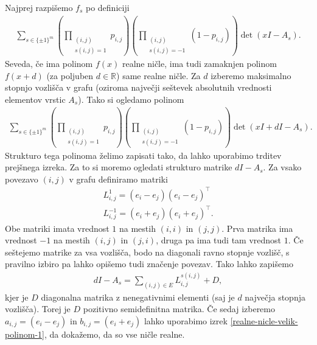 \begin{dokaz}
    Najprej razpišemo \(f_s\) po definiciji
    \begin{align*}
        \sum_{s\in \{\pm 1\}^m} \left(\prod_{\substack{(i,j) \\s(i,j)=1}} p_{i,j}\right) \left(\prod_{\substack{(i,j)\\s(i,j)=-1}} (1- p_{i,j})\right) \det(xI - A_s).
    \end{align*}
    Seveda, če ima polinom \(f(x)\) realne ničle, ima tudi zamaknjen polinom \(f(x+d)\) (za poljuben \(d\in \mathbb R\)) same realne ničle. Za \(d\) izberemo maksimalno stopnjo vozlišča v grafu (oziroma največji seštevek absolutnih vrednosti elementov vrstic \(A_s\)). Tako si ogledamo polinom
    \begin{align*}
        \sum_{s\in \{\pm 1\}^m} \left(\prod_{\substack{(i,j) \\s(i,j)=1}} p_{i,j}\right) \left(\prod_{\substack{(i,j)\\s(i,j)=-1}} (1- p_{i,j})\right) \det(xI + dI - A_s).
    \end{align*}
    Strukturo tega polinoma želimo zapisati tako, da lahko uporabimo trditev prejšnega izreka. Za to si moremo ogledati strukturo matrike \(dI - A_s\). Za vsako povezavo \((i,j)\) v grafu definiramo matriki
    \begin{align*}
        L_{i,j}^1 = (e_i-e_j)(e_i-e_j)^\top \\
        L_{i,j}^{-1} = (e_i+e_j)(e_i+e_j)^\top.
    \end{align*}
    Obe matriki imata vrednost \(1\) na mestih \((i,i)\) in \((j,j)\). Prva matrika ima vrednost \(-1\) na mestih \((i,j)\) in \((j,i)\), druga pa ima tudi tam vrednost \(1\). Če seštejemo matrike za vsa vozlišča, bodo na diagonali ravno stopnje vozlišč, s pravilno izbiro pa lahko opišemo tudi značenje povezav. Tako lahko zapišemo
    \begin{align*}
        dI - A_s = \sum_{(i,j)\in E} L_{i,j}^{s(i,j)} + D,
    \end{align*}
    kjer je \(D\) diagonalna matrika z nenegativnimi elementi (saj je \(d\) največja stopnja vozlišča). Torej je \(D\) pozitivno semidefinitna matrika. Če sedaj izberemo \(a_{i,j} = (e_i-e_j)\) in \(b_{i,j} = (e_i+e_j)\) lahko uporabimo izrek \ref{realne-nicle-velik-polinom-1}, da dokažemo, da so vse ničle realne.
\end{dokaz}

